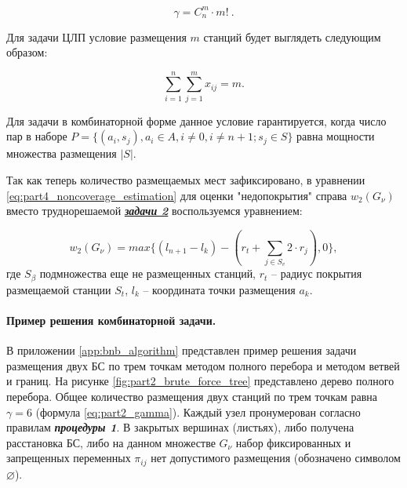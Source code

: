 \begin{equation}
  \label{eq:part2_gamma}
  \gamma = C^m_n \cdot m! \ .
\end{equation}

Для задачи ЦЛП условие размещения $m$ станций будет выглядеть следующим образом:


\begin{equation}
  \label{eq:part3_placed_all_station}
  \sum\limits_{i=1}^n \sum\limits_{j=1}^m x_{ij} = m.
\end{equation}

Для задачи в комбинаторной форме данное условие гарантируется, когда число пар в наборе $P = \{ (a_i, s_j), a_i \in A, i \neq 0, i \neq n + 1; s_j \in S\}$ равна мощности множества размещения $|S|$. 

Так как теперь количество размещаемых мест зафиксировано, в уравнении \cref{eq:part4_noncoverage_estimation} для оценки "недопокрытия" справа $w_2 \left(G_\nu \right)$ вместо труднорешаемой \underline{\textit{\textbf{задачи 2}}} воспользуемся уравнением:

\begin{equation}\label{eq2}
  w_2 \left(G_\nu \right) = max\{\left(l_{n+1}-l_k\right)-(r_t+\sum_{j\in S_v}{2 \cdot r_j}),0\},
\end{equation}
где $S_\beta$ подмножества еще не размещенных станций, $r_t$ -- радиус покрытия размещаемой станции $S_t$, $l_k$ -- координата точки размещения $a_k$.

\paragraph{Пример решения комбинаторной задачи.}

В приложении \cref{app:bnb_algorithm} представлен пример решения задачи размещения двух БС  по трем точкам методом полного перебора и методом ветвей и границ. На рисунке \cref{fig:part2_brute_force_tree} представлено дерево полного перебора. Общее количество размещения двух станций по трем точкам равна $\gamma = 6$ (формула \cref{eq:part2_gamma}). Каждый узел пронумерован согласно правилам \textit{\textbf{процедуры 1}}. В закрытых вершинах (листьях), либо получена расстановка БС, либо на данном множестве $G_\nu$ набор фиксированных и запрещенных переменных $\pi_{ij}$ нет допустимого размещения (обозначено символом $\varnothing$).

